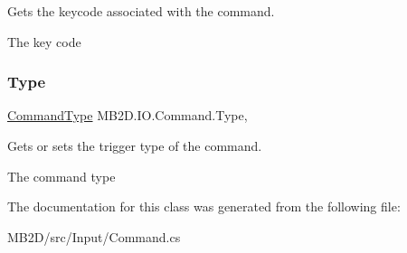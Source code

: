 Gets the keycode associated with the command. 

The key code\hypertarget{class_m_b2_d_1_1_i_o_1_1_command_afd1e0b56bee6e683db89a55c3b155f9b}{}\label{class_m_b2_d_1_1_i_o_1_1_command_afd1e0b56bee6e683db89a55c3b155f9b} 
\subsubsection{\texorpdfstring{Type}{Type}}
{\footnotesize\ttfamily \hyperlink{namespace_m_b2_d_1_1_i_o_ab5f95f3fe9e652778b62bdf943168a68}{Command\+Type} M\+B2\+D.\+I\+O.\+Command.\+Type\hspace{0.3cm}{\ttfamily [get]}, {\ttfamily [set]}}



Gets or sets the trigger type of the command. 

The command type

The documentation for this class was generated from the following file\+:\begin{DoxyCompactItemize}
\item 
M\+B2\+D/src/\+Input/Command.\+cs\end{DoxyCompactItemize}
